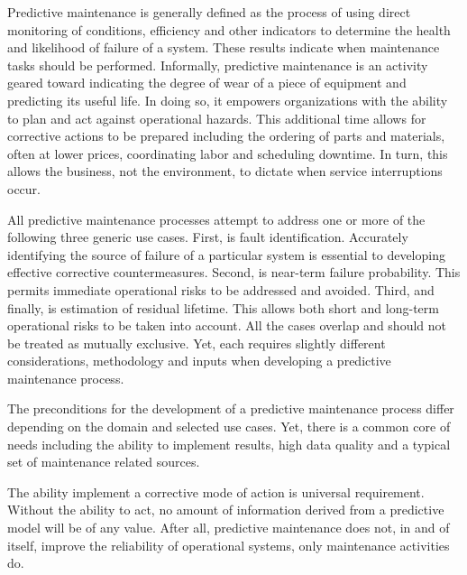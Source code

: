 Predictive maintenance is generally defined as the process of using direct monitoring of conditions, efficiency and other indicators to determine the health and likelihood of failure of a system. These results indicate when maintenance tasks should be performed\cite{Mobley2002}. Informally, predictive maintenance is an activity geared toward indicating the degree of wear of a piece of equipment and predicting its useful life\cite{Levitt2011}. In doing so, it empowers organizations with the ability to plan and act against operational hazards. This additional time allows for corrective actions to be prepared including the ordering of parts and materials, often at lower prices, coordinating labor and scheduling downtime. In turn, this allows the business, not the environment, to dictate when service interruptions occur. 


All predictive maintenance processes attempt to address one or more of the following three generic use cases\cite{Uz2016}. First, is fault identification. Accurately identifying the source of failure of a particular system is essential to developing effective corrective countermeasures. Second, is near-term failure probability. This permits immediate operational risks to be addressed and avoided. Third, and finally, is estimation of residual lifetime. This allows both short and long-term operational risks to be taken into account. All the cases overlap and should not be treated as mutually exclusive. Yet, each requires slightly different considerations, methodology and inputs when developing a predictive maintenance process.

The preconditions for the development of a predictive maintenance process differ depending on the domain and selected use cases. Yet, there is a common core of needs including the ability to implement results, high data quality and a typical set of maintenance related sources. 

The ability implement a corrective mode of action is universal requirement. Without the ability to act, no amount of information derived from a predictive model will be of any value. After all, predictive maintenance does not, in and of itself, improve the reliability of operational systems, only maintenance activities do\cite{Levitt2011}. 

